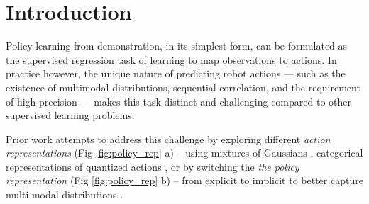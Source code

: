 


\section{Introduction}

Policy learning from demonstration, in its simplest form, can be formulated as the supervised regression task of learning to map observations to actions.
In practice however, the unique nature of predicting robot actions --- such as the existence of multimodal distributions, sequential correlation, and the requirement of high precision ---  makes this task distinct and challenging compared to other supervised learning problems.   




Prior work attempts to address this challenge by exploring different \textit{action representations} (Fig \ref{fig:policy_rep} a) -- using mixtures of Gaussians \cite{robomimic}, categorical representations of quantized actions \cite{bet},
or by switching the \textit{the policy representation} (Fig \ref{fig:policy_rep} b) -- from  explicit to implicit to better capture multi-modal distributions \cite{ibc,wu2020spatial}.

